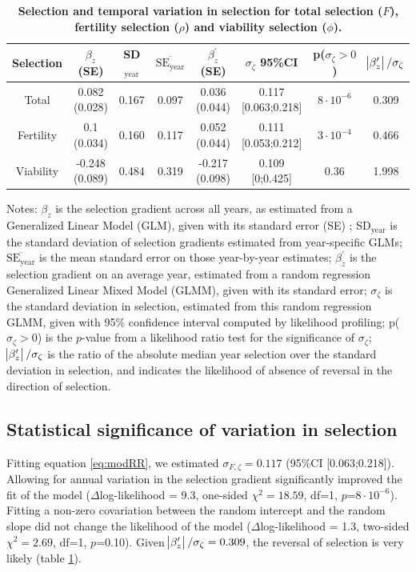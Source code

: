 \begin{table}[ht]
{\centering
\caption{\textbf{Selection and temporal variation in selection for total selection ($F$), fertility selection ($\rho$) and viability selection ($\phi$).}}
\label{Test_table}
\begingroup\footnotesize
\begin{tabular}{cccccccc}
\toprule
	Selection & $\beta_z$ (SE)	&	SD$_\text{year}$&	$\overline{\text{SE}_\text{year}}$ & $\beta_{z}^{\prime}$ (SE) & $\sigma_{\zeta}$ 95\%CI & p($\sigma_{\zeta}>0$) & $\abs{\beta_{z}^\prime}/\sigma_{\zeta}$\\
	\midrule  
Total &	0.082 (0.028) & 0.167 & 0.097 & 0.036 (0.044) & 0.117 [0.063;0.218]			& $8\cdot10^{-6}$ 			& 0.309\\ 
Fertility &	0.1 (0.034) & 0.160 & 0.117 & 0.052 (0.044) & 0.111 [0.053;0.212]		& $3\cdot10^{-4}$		& 0.466 \\ 
Viability &	-0.248 (0.089) & 0.484 & 0.319 & -0.217 (0.098) & 0.109 [0;0.425] & $0.36$ & 1.998 \\ 
\bottomrule  
  \end{tabular}
	\label{tab:varsel}
\endgroup}
\footnotesize

Notes: $\beta_z$ is the selection gradient across all years, as estimated from a Generalized Linear Model (GLM),  given with its standard error (SE) ; SD$_\text{year}$ is the standard deviation of selection gradients estimated from year-specific GLMs; $\overline{\text{SE}_\text{year}}$ is the mean standard error on those year-by-year estimates; $\beta_{z}^{\prime}$ is the selection gradient on an average year, estimated from a random regression Generalized Linear Mixed Model (GLMM), given with its standard error; $\sigma_{\zeta}$ is the standard deviation in selection, estimated from this random regression GLMM, given with 95\% confidence interval computed by likelihood profiling; p($\sigma_{\zeta}>0$) is the $p$-value from a likelihood ratio test for the significance of $\sigma_{\zeta}$; $\abs{\beta_{z}^\prime}/\sigma_{\zeta}$ is the ratio of the absolute median year selection over the standard deviation in selection, and indicates the likelihood of absence of reversal in the direction of selection.
\end{table}

\subsection*{Statistical significance of variation in selection}
Fitting equation \ref{eq:modRR}, we estimated $\sigma_{F,\zeta} = 0.117$ (95\%CI [0.063;0.218]).
Allowing for annual variation in the selection gradient significantly improved the fit of the model 
($\Delta$log-likelihood = 9.3, one-sided $\chi^2=18.59$, df=1, $p$=$8\cdot10^{-6}$). Fitting a non-zero covariation between the random intercept and the random slope did not change the likelihood of the model ($\Delta$log-likelihood = 1.3, two-sided $\chi^2=2.69$, df=1, $p$=0.10). Given $\abs{\beta_{z}^\prime}/\sigma_{\zeta}=0.309$, the reversal of selection is very likely (table \ref{tab:varsel}).


